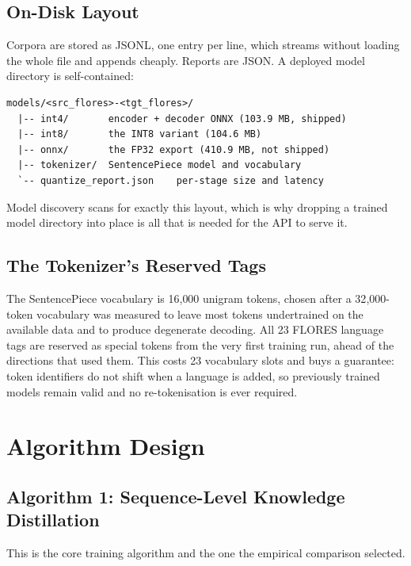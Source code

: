 \subsection{On-Disk Layout}
\label{subsec:ondisk}

Corpora are stored as JSONL, one entry per line, which streams without loading
the whole file and appends cheaply. Reports are JSON. A deployed model
directory is self-contained:

\begin{verbatim}
models/<src_flores>-<tgt_flores>/
  |-- int4/       encoder + decoder ONNX (103.9 MB, shipped)
  |-- int8/       the INT8 variant (104.6 MB)
  |-- onnx/       the FP32 export (410.9 MB, not shipped)
  |-- tokenizer/  SentencePiece model and vocabulary
  `-- quantize_report.json    per-stage size and latency
\end{verbatim}

Model discovery scans for exactly this layout, which is why dropping a trained
model directory into place is all that is needed for the API to serve it.

\subsection{The Tokenizer's Reserved Tags}
\label{subsec:tokenizer}

The SentencePiece vocabulary is 16{,}000 unigram tokens, chosen after a
32{,}000-token vocabulary was measured to leave most tokens undertrained on the
available data and to produce degenerate decoding. All 23 FLORES language tags
are reserved as special tokens from the very first training run, ahead of the
directions that used them. This costs 23 vocabulary slots and buys a guarantee:
token identifiers do not shift when a language is added, so previously trained
models remain valid and no re-tokenisation is ever required.

\section{Algorithm Design}
\label{sec:algorithms}

\subsection{Algorithm 1: Sequence-Level Knowledge Distillation}
\label{subsec:alg1}

This is the core training algorithm and the one the empirical comparison
selected.

